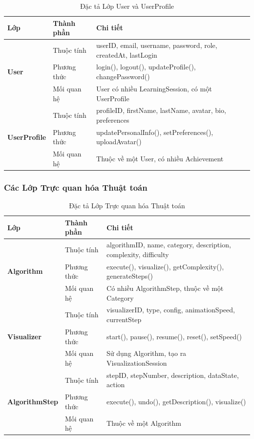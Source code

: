\begin{table}[H]
\centering
\caption{Đặc tả Lớp User và UserProfile}
\label{tab:user-classes}
\begin{tabular}{|p{2cm}|p{5cm}|p{6cm}|}
\hline
\textbf{Lớp} & \textbf{Thành phần} & \textbf{Chi tiết} \\
\hline
\multirow{3}{2cm}{\textbf{User}} 
& Thuộc tính & userID, email, username, password, role, createdAt, lastLogin \\
\cline{2-3}
& Phương thức & login(), logout(), updateProfile(), changePassword() \\
\cline{2-3}
& Mối quan hệ & User có nhiều LearningSession, có một UserProfile \\
\hline
\multirow{3}{2cm}{\textbf{UserProfile}} 
& Thuộc tính & profileID, firstName, lastName, avatar, bio, preferences \\
\cline{2-3}
& Phương thức & updatePersonalInfo(), setPreferences(), uploadAvatar() \\
\cline{2-3}
& Mối quan hệ & Thuộc về một User, có nhiều Achievement \\
\hline
\end{tabular}
\end{table}

\subsubsection{Các Lớp Trực quan hóa Thuật toán}

\begin{table}[H]
\centering
\caption{Đặc tả Lớp Trực quan hóa Thuật toán}
\label{tab:visualization-classes}
\begin{tabular}{|p{2.5cm}|p{4.5cm}|p{6cm}|}
\hline
\textbf{Lớp} & \textbf{Thành phần} & \textbf{Chi tiết} \\
\hline
\multirow{3}{2.5cm}{\textbf{Algorithm}} 
& Thuộc tính & algorithmID, name, category, description, complexity, difficulty \\
\cline{2-3}
& Phương thức & execute(), visualize(), getComplexity(), generateSteps() \\
\cline{2-3}
& Mối quan hệ & Có nhiều AlgorithmStep, thuộc về một Category \\
\hline
\multirow{3}{2.5cm}{\textbf{Visualizer}} 
& Thuộc tính & visualizerID, type, config, animationSpeed, currentStep \\
\cline{2-3}
& Phương thức & start(), pause(), resume(), reset(), setSpeed() \\
\cline{2-3}
& Mối quan hệ & Sử dụng Algorithm, tạo ra VisualizationSession \\
\hline
\multirow{3}{2.5cm}{\textbf{AlgorithmStep}} 
& Thuộc tính & stepID, stepNumber, description, dataState, action \\
\cline{2-3}
& Phương thức & execute(), undo(), getDescription(), visualize() \\
\cline{2-3}
& Mối quan hệ & Thuộc về một Algorithm \\
\hline
\end{tabular}
\end{table}

